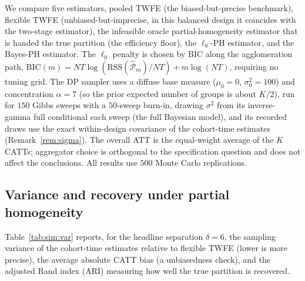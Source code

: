 \documentclass[margin=5in, 12pt]{article}
\newcommand{\1}{\mathbbm{1}}
\begin{document}
We compare five estimators, pooled TWFE (the biased-but-precise benchmark),
flexible TWFE (unbiased-but-imprecise, in this balanced design it coincides with
the \citet{gardner2022two} two-stage estimator), the infeasible oracle
partial-homogeneity estimator that is handed the true partition (the efficiency
floor), the $\ell_0$-PH estimator, and the Bayes-PH estimator. The $\ell_0$ penalty is
chosen by BIC \citep{schwarz1978} along the agglomeration path,
$\mathrm{BIC}(m) = NT\log(\mathrm{RSS}(\hat{\mathcal P}_m)/NT) + m\log(NT)$,
requiring no tuning grid. The DP sampler uses a diffuse base measure
($\mu_0=0$, $\sigma_0^2=100$) and concentration $\alpha=7$ (so the prior expected
number of groups is about $K/2$), run for $150$ Gibbs sweeps with a $50$-sweep
burn-in, drawing $\sigma^{2}$ from its inverse-gamma full conditional each sweep
(the full Bayesian model), and its recorded draws use the exact within-design
covariance of the cohort-time estimates (Remark~\ref{rem:sigma}). The overall ATT is the
equal-weight average of the $K$ CATTs; aggregator choice is orthogonal to the
specification question and does not affect the conclusions. All results use
$500$ Monte Carlo replications.

\subsection{Variance and recovery under partial homogeneity}
\label{sec:sim:var}

Table~\ref{tab:sim:var} reports, for the headline separation $\delta=6$, the
sampling variance of the cohort-time estimates relative to flexible TWFE (lower
is more precise), the average absolute CATT bias (a unbiasedness check), and the
adjusted Rand index (ARI) measuring how well the true partition is recovered.
\end{document}
